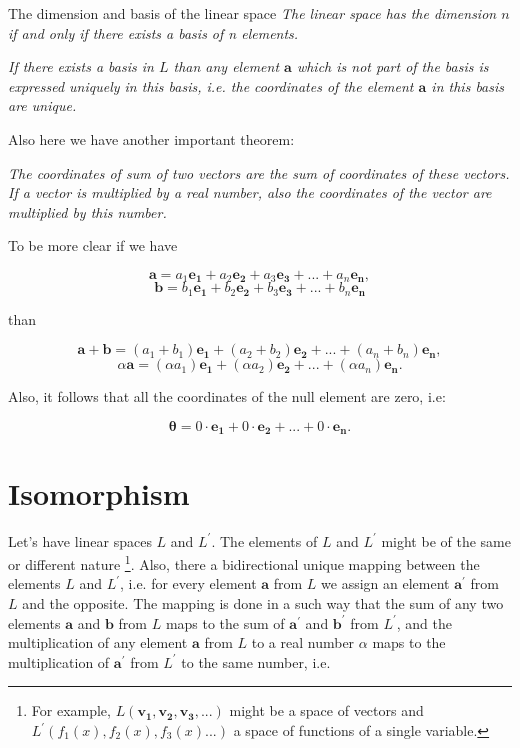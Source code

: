 \documentclass{book}
\begin{document}
\begin{section}{The dimension and basis of the linear space}
\emph{The linear space has the dimension $n$ if and only if there exists a basis of n elements.}

\emph{If there exists a basis in $L$ than any element $\boldsymbol{a}$ which is not part of the basis is expressed uniquely in this basis, i.e. the coordinates of the element $\boldsymbol{a}$ in this basis are unique.}

Also here we have another important theorem:

\emph{The coordinates of sum of two vectors are the sum of coordinates of these vectors. If a vector is multiplied by a real number, also the coordinates of the vector are multiplied by this number.}

To be more clear if we have

\[\boldsymbol{a} = a_1\boldsymbol{e_1} + a_2\boldsymbol{e_2} + a_3\boldsymbol{e_3} + ... + a_n\boldsymbol{e_n},\]
\[\boldsymbol{b} = b_1\boldsymbol{e_1} + b_2\boldsymbol{e_2} + b_3\boldsymbol{e_3} + ... + b_n\boldsymbol{e_n}\]

than

\[\boldsymbol{a} + \boldsymbol{b} = (a_1 + b_1)\boldsymbol{e_1} + (a_2 + b_2)\boldsymbol{e_2} + ... + (a_n + b_n)\boldsymbol{e_n},\]
\[{\alpha}\boldsymbol{a} = ({\alpha}a_1)\boldsymbol{e_1} + ({\alpha}a_2)\boldsymbol{e_2} + ... + ({\alpha}a_n)\boldsymbol{e_n}.\]

Also, it follows that all the coordinates of the null element are zero, i.e:

\[\boldsymbol{\theta} = 0{\cdot}\boldsymbol{e_1} + 0{\cdot}\boldsymbol{e_2} + ... + 0{\cdot}\boldsymbol{e_n}.\]
\end{section}

\section{Isomorphism}

Let's have linear spaces $L$ and $L^'$. The elements of $L$ and $L^'$ might be of the same or different nature \footnote{For example, $L(\boldsymbol{v_1}, \boldsymbol{v_2}, \boldsymbol{v_3},...)$ might be a space of vectors and $L^{'}(f_1(x), f_2(x), f_3(x) ...)$ a space of functions of a single variable.}. Also, there a bidirectional unique mapping between the elements $L$ and ${L^{'}}$, i.e. for every element $\boldsymbol{a}$ from $L$ we assign an element $\boldsymbol{a^{'}}$ from $L$ and the opposite. The mapping is done in a such way that the sum of any two elements $\boldsymbol{a}$ and $\boldsymbol{b}$ from $L$ maps to the sum of $\boldsymbol{a^{'}}$ and $\boldsymbol{b^{'}}$ from $L^{'}$, and the multiplication of any element $\boldsymbol{a}$ from $L$ to a real number $\alpha$ maps to the multiplication of $\boldsymbol{a^{'}}$ from $L^{'}$ to the same number, i.e.
\end{document}
